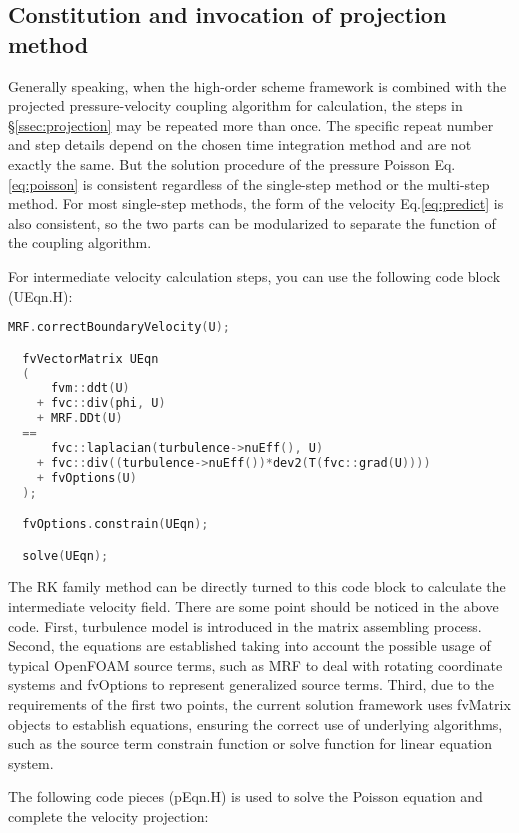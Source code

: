 \documentclass{article}
\begin{document}
\subsection{Constitution and invocation of projection method}

Generally speaking, when the high-order scheme framework is combined with the projected pressure-velocity coupling algorithm for calculation, the steps in \S\ref{ssec:projection} may be repeated more than once. The specific repeat number and step details depend on the chosen time integration method and are not exactly the same. But the solution procedure of the pressure Poisson Eq.\eqref{eq:poisson} is consistent regardless of the single-step method or the multi-step method. For most single-step methods, the form of the velocity Eq.\eqref{eq:predict} is also consistent, so the two parts can be modularized to separate the function of the coupling algorithm.

For intermediate velocity calculation steps, you can use the following code block (UEqn.H):

\begin{lstlisting}[language=C++]
  MRF.correctBoundaryVelocity(U);

  fvVectorMatrix UEqn
  (
      fvm::ddt(U)
    + fvc::div(phi, U)
    + MRF.DDt(U)
  ==
      fvc::laplacian(turbulence->nuEff(), U)
    + fvc::div((turbulence->nuEff())*dev2(T(fvc::grad(U))))
    + fvOptions(U)
  );

  fvOptions.constrain(UEqn);

  solve(UEqn);
\end{lstlisting}

The RK family method can be directly turned to this code block to calculate the intermediate velocity field. There are some point should be noticed in the above code. First, turbulence model is introduced in the matrix assembling process. Second, the equations are established taking into account the possible usage of typical OpenFOAM source terms, such as MRF to deal with rotating coordinate systems and fvOptions to represent generalized source terms. Third, due to the requirements of the first two points, the current solution framework uses fvMatrix objects to establish equations, ensuring the correct use of underlying algorithms, such as the source term constrain function or solve function for linear equation system.

The following code pieces (pEqn.H) is used to solve the Poisson equation and complete the velocity projection:
\end{document}
